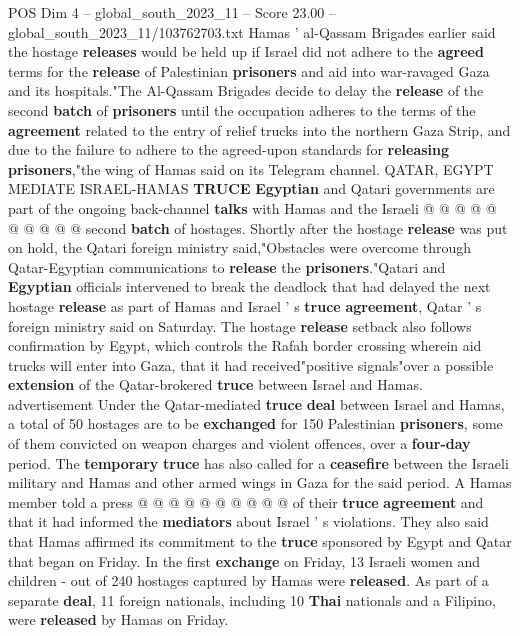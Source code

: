 \begin{textsample}{POS Dim 4 – global\_south\_2023\_11 – Score 23.00 – global\_south\_2023\_11/103762703.txt}
Hamas ' al-Qassam Brigades earlier said the hostage \textbf{releases} would be held up if Israel did not adhere to the \textbf{agreed} terms for the \textbf{release} of Palestinian \textbf{prisoners} and aid into war-ravaged Gaza and its hospitals."The Al-Qassam Brigades decide to delay the \textbf{release} of the second \textbf{batch} of \textbf{prisoners} until the occupation adheres to the terms of the \textbf{agreement} related to the entry of relief trucks into the northern Gaza Strip, and due to the failure to adhere to the agreed-upon standards for \textbf{releasing} \textbf{prisoners},"the wing of Hamas said on its Telegram channel.
QATAR, EGYPT MEDIATE ISRAEL-HAMAS \textbf{TRUCE} \textbf{Egyptian} and Qatari governments are part of the ongoing back-channel \textbf{talks} with Hamas and the Israeli @ @ @ @ @ @ @ @ @ @ second \textbf{batch} of hostages.
Shortly after the hostage \textbf{release} was put on hold, the Qatari foreign ministry said,"Obstacles were overcome through Qatar-Egyptian communications to \textbf{release} the \textbf{prisoners}."Qatari and \textbf{Egyptian} officials intervened to break the deadlock that had delayed the next hostage \textbf{release} as part of Hamas and Israel ' s \textbf{truce} \textbf{agreement}, Qatar ' s foreign ministry said on Saturday.
The hostage \textbf{release} setback also follows confirmation by Egypt, which controls the Rafah border crossing wherein aid trucks will enter into Gaza, that it had received"positive signals"over a possible \textbf{extension} of the Qatar-brokered \textbf{truce} between Israel and Hamas. advertisement Under the Qatar-mediated \textbf{truce} \textbf{deal} between Israel and Hamas, a total of 50 hostages are to be \textbf{exchanged} for 150 Palestinian \textbf{prisoners}, some of them convicted on weapon charges and violent offences, over a \textbf{four-day} period.
The \textbf{temporary} \textbf{truce} has also called for a \textbf{ceasefire} between the Israeli military and Hamas and other armed wings in Gaza for the said period.
A Hamas member told a press @ @ @ @ @ @ @ @ @ @ of their \textbf{truce} \textbf{agreement} and that it had informed the \textbf{mediators} about Israel ' s violations.
They also said that Hamas affirmed its commitment to the \textbf{truce} sponsored by Egypt and Qatar that began on Friday.
In the first \textbf{exchange} on Friday, 13 Israeli women and children - out of 240 hostages captured by Hamas were \textbf{released}.
As part of a separate \textbf{deal}, 11 foreign nationals, including 10 \textbf{Thai} nationals and a Filipino, were \textbf{released} by Hamas on Friday.

\end{textsample}
